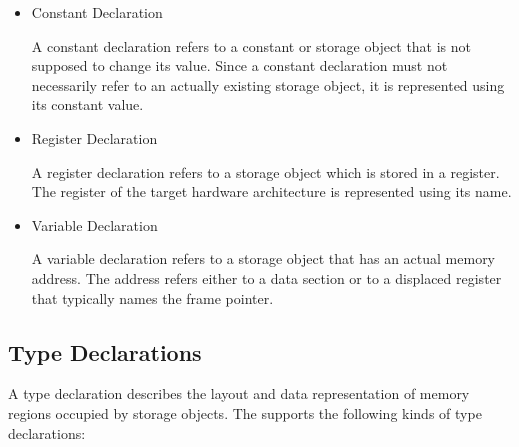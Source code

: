 \begin{itemize}

\item Constant Declaration\nopagebreak

A constant declaration refers to a constant or storage object that is not supposed to change its value.
Since a constant declaration must not necessarily refer to an actually existing storage object, it is represented using its constant value.

\item Register Declaration\nopagebreak

A register declaration refers to a storage object which is stored in a register.
The register of the target hardware architecture is represented using its name.

\item Variable Declaration\nopagebreak

A variable declaration refers to a storage object that has an actual memory address.
The address refers either to a data section or to a displaced register that typically names the frame pointer.

\end{itemize}

\subsection{Type Declarations}\label{sec:dbgtypedeclarations}

A type declaration describes the layout and data representation of memory regions occupied by storage objects.
The \ecs{} supports the following kinds of type declarations:

